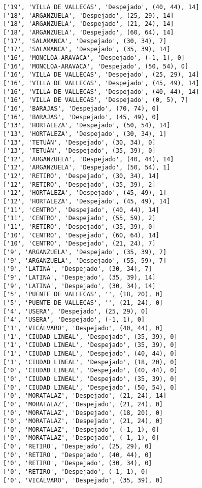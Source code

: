 \documentclass[11pt]{article}
\begin{document}
\begin{Verbatim}[commandchars=\\\{\}]
['19', 'VILLA DE VALLECAS', 'Despejado', (40, 44), 14]
['18', 'ARGANZUELA', 'Despejado', (25, 29), 14]
['18', 'ARGANZUELA', 'Despejado', (21, 24), 14]
['18', 'ARGANZUELA', 'Despejado', (60, 64), 14]
['17', 'SALAMANCA', 'Despejado', (30, 34), 7]
['17', 'SALAMANCA', 'Despejado', (35, 39), 14]
['16', 'MONCLOA-ARAVACA', 'Despejado', (-1, 1), 0]
['16', 'MONCLOA-ARAVACA', 'Despejado', (50, 54), 0]
['16', 'VILLA DE VALLECAS', 'Despejado', (25, 29), 14]
['16', 'VILLA DE VALLECAS', 'Despejado', (45, 49), 14]
['16', 'VILLA DE VALLECAS', 'Despejado', (40, 44), 14]
['16', 'VILLA DE VALLECAS', 'Despejado', (0, 5), 7]
['16', 'BARAJAS', 'Despejado', (70, 74), 0]
['16', 'BARAJAS', 'Despejado', (45, 49), 0]
['13', 'HORTALEZA', 'Despejado', (50, 54), 14]
['13', 'HORTALEZA', 'Despejado', (30, 34), 1]
['13', 'TETUÁN', 'Despejado', (30, 34), 0]
['13', 'TETUÁN', 'Despejado', (35, 39), 0]
['12', 'ARGANZUELA', 'Despejado', (40, 44), 14]
['12', 'ARGANZUELA', 'Despejado', (50, 54), 1]
['12', 'RETIRO', 'Despejado', (30, 34), 14]
['12', 'RETIRO', 'Despejado', (35, 39), 2]
['12', 'HORTALEZA', 'Despejado', (45, 49), 1]
['12', 'HORTALEZA', 'Despejado', (45, 49), 14]
['11', 'CENTRO', 'Despejado', (40, 44), 14]
['11', 'CENTRO', 'Despejado', (55, 59), 2]
['11', 'RETIRO', 'Despejado', (35, 39), 0]
['10', 'CENTRO', 'Despejado', (60, 64), 14]
['10', 'CENTRO', 'Despejado', (21, 24), 7]
['9', 'ARGANZUELA', 'Despejado', (35, 39), 7]
['9', 'ARGANZUELA', 'Despejado', (55, 59), 7]
['9', 'LATINA', 'Despejado', (30, 34), 7]
['9', 'LATINA', 'Despejado', (35, 39), 14]
['9', 'LATINA', 'Despejado', (30, 34), 14]
['5', 'PUENTE DE VALLECAS', '', (18, 20), 0]
['5', 'PUENTE DE VALLECAS', '', (21, 24), 0]
['4', 'USERA', 'Despejado', (25, 29), 0]
['4', 'USERA', 'Despejado', (-1, 1), 0]
['1', 'VICÁLVARO', 'Despejado', (40, 44), 0]
['1', 'CIUDAD LINEAL', 'Despejado', (35, 39), 0]
['1', 'CIUDAD LINEAL', 'Despejado', (35, 39), 0]
['1', 'CIUDAD LINEAL', 'Despejado', (40, 44), 0]
['1', 'CIUDAD LINEAL', 'Despejado', (18, 20), 0]
['0', 'CIUDAD LINEAL', 'Despejado', (40, 44), 0]
['0', 'CIUDAD LINEAL', 'Despejado', (35, 39), 0]
['0', 'CIUDAD LINEAL', 'Despejado', (50, 54), 0]
['0', 'MORATALAZ', 'Despejado', (21, 24), 14]
['0', 'MORATALAZ', 'Despejado', (21, 24), 0]
['0', 'MORATALAZ', 'Despejado', (18, 20), 0]
['0', 'MORATALAZ', 'Despejado', (21, 24), 0]
['0', 'MORATALAZ', 'Despejado', (-1, 1), 0]
['0', 'MORATALAZ', 'Despejado', (-1, 1), 0]
['0', 'RETIRO', 'Despejado', (25, 29), 0]
['0', 'RETIRO', 'Despejado', (40, 44), 0]
['0', 'RETIRO', 'Despejado', (30, 34), 0]
['0', 'RETIRO', 'Despejado', (-1, 1), 0]
['0', 'VICÁLVARO', 'Despejado', (35, 39), 0]

\end{Verbatim}
\end{document}
